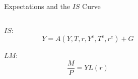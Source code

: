 \documentclass[shownotes,11pt, aspectratio=169]{beamer}
\newenvironment{wideitemize}{\itemize\addtolength{\itemsep}{10pt}}{\enditemize}
\begin{document}
\begin{frame}{Expectations and the $IS$ Curve}
\begin{columns}[T] %
\begin{column}{.52\textwidth}
  \begin{wideitemize}
   \item $IS$: \begin{equation*}
            Y = A(Y, T, r, Y^e, T^e, r^e) + G
               \end{equation*}
   \item $LM$: \begin{equation*}
           \frac{M}{P} = YL(r)  
               \end{equation*}     
   \end{wideitemize}
\end{column}%
\pause
\hfill%
\begin{column}{.44\textwidth}
\end{column}%
\end{columns}
\end{frame}
\end{document}
